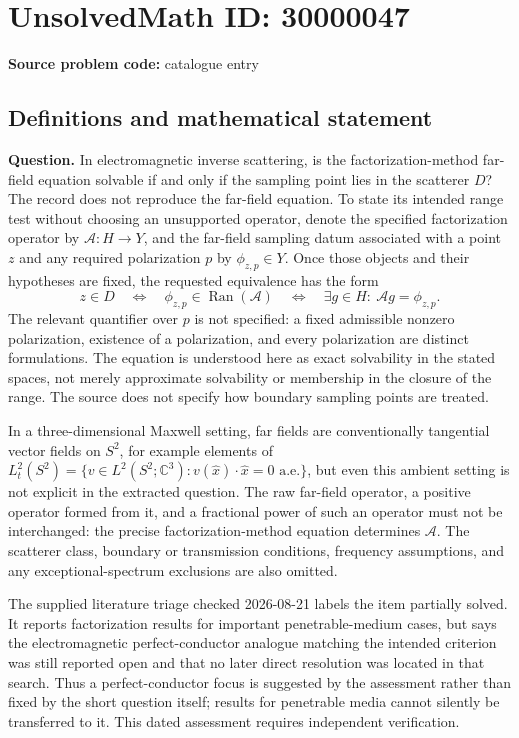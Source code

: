 \documentclass[11pt]{article}
\newcommand{\C}{\mathbb{C}}
\begin{document}
\section*{UnsolvedMath ID: 30000047}
\textbf{Source problem code:} catalogue entry
\subsection{Definitions and mathematical statement}
\textbf{Question.} In electromagnetic inverse scattering, is the factorization-method far-field equation solvable if and only if the sampling point lies in the scatterer \(D\)? The record does not reproduce the far-field equation. To state its intended range test without choosing an unsupported operator, denote the specified factorization operator by \(\mathcal A:H\to Y\), and the far-field sampling datum associated with a point \(z\) and any required polarization \(p\) by \(\phi_{z,p}\in Y\). Once those objects and their hypotheses are fixed, the requested equivalence has the form\[z\in D\quad\Longleftrightarrow\quad\phi_{z,p}\in\operatorname{Ran}(\mathcal A)\quad\Longleftrightarrow\quad\exists g\in H:\ \mathcal A g=\phi_{z,p}.\] The relevant quantifier over \(p\) is not specified: a fixed admissible nonzero polarization, existence of a polarization, and every polarization are distinct formulations. The equation is understood here as exact solvability in the stated spaces, not merely approximate solvability or membership in the closure of the range. The source does not specify how boundary sampling points are treated.\par In a three-dimensional Maxwell setting, far fields are conventionally tangential vector fields on \(S^2\), for example elements of \(L_t^2(S^2)=\{v\in L^2(S^2;\C^3):v(\widehat x)\cdot\widehat x=0\text{ a.e.}\}\), but even this ambient setting is not explicit in the extracted question. The raw far-field operator, a positive operator formed from it, and a fractional power of such an operator must not be interchanged: the precise factorization-method equation determines \(\mathcal A\). The scatterer class, boundary or transmission conditions, frequency assumptions, and any exceptional-spectrum exclusions are also omitted.\par The supplied literature triage checked 2026-08-21 labels the item partially solved. It reports factorization results for important penetrable-medium cases, but says the electromagnetic perfect-conductor analogue matching the intended criterion was still reported open and that no later direct resolution was located in that search. Thus a perfect-conductor focus is suggested by the assessment rather than fixed by the short question itself; results for penetrable media cannot silently be transferred to it. This dated assessment requires independent verification.
\end{document}
